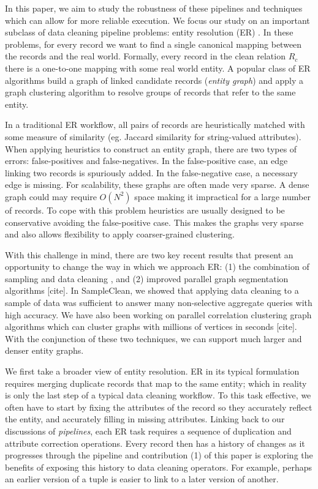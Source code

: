 In this paper, we aim to study the robustness of these pipelines and techniques which can allow for more reliable execution.
We focus our study on an important subclass of data cleaning pipeline problems: entity resolution (ER) \cite{DBLP:journals/pvldb/KopckeTR10, conf/dmkd/MongeE97, conf/sigmod/WhangMKTG09, conf/acl/FinkelM08, conf/sigmod/WangLF12, Fellegi1969, conf/sigmod/ArasuGK10, DBLP:journals/tkde/ElmagarmidIV07, journals/tkde/Christen11}. 
In these problems, for every record we want to find a single canonical mapping between the records and the real world.
Formally, every record in the clean relation $R_c$ there is a one-to-one mapping with some real world entity.
A popular class of ER algorithms build a graph of linked candidate records (\emph{entity graph}) \cite{wang1999sample} and apply a graph clustering algorithm to resolve groups of records that refer to the same entity.

In a traditional ER workflow, all pairs of records are heuristically matched with some measure of similarity (eg. Jaccard similarity for string-valued attributes).
When applying heuristics to construct an entity graph, there are two types of errors: false-positives and false-negatives. 
In the false-positive case, an edge linking two records is spuriously added. 
In the false-negative case, a necessary edge is missing. 
For scalability, these graphs are often made very sparse.
A dense graph could may require $O(N^2)$ space making it impractical for a large number of records.
To cope with this problem heuristics are usually designed to be conservative avoiding the false-positive case.
This makes the graphs very sparse and also allows flexibility to apply coarser-grained clustering.

With this challenge in mind, there are two key recent results that present an opportunity to change the way in which we approach ER: (1) the combination of sampling and data cleaning \cite{wang1999sample}, and (2) improved parallel graph segmentation algorithms [cite]. 
In SampleClean, we showed that applying data cleaning to a sample of data was sufficient to answer many non-selective aggregate queries with high accuracy. We have also been working on parallel correlation clustering graph algorithms which can cluster graphs with millions of vertices in seconds [cite].
With the conjunction of these two techniques, we can support much larger and denser entity graphs.

We first take a broader view of entity resolution.
ER in its typical formulation requires merging duplicate records that map to the same entity; which in reality is only the last step of a typical data cleaning workflow.
To this task effective, we often have to start by fixing the attributes of the record so they accurately reflect the entity, and accurately filling in missing attributes.
Linking back to our discussions of \emph{pipelines}, each ER task requires a sequence of duplication and attribute correction operations.
Every record then has a history of changes as it progresses through the pipeline and contribution (1) of this paper is exploring the benefits of exposing this history to data cleaning operators.
For example, perhaps an earlier version of a tuple is easier to link to a later version of another.

